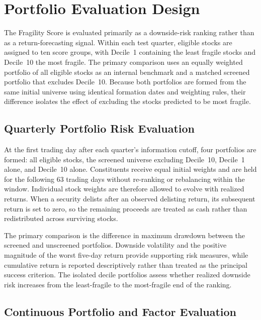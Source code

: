 \section{Portfolio Evaluation Design}
\label{sec:portfolio_evaluation_design}

The Fragility Score is evaluated primarily as a downside-risk ranking rather than as a return-forecasting signal. Within each test quarter, eligible stocks are assigned to ten score groups, with Decile~1 containing the least fragile stocks and Decile~10 the most fragile. The primary comparison uses an equally weighted portfolio of all eligible stocks as an internal benchmark and a matched screened portfolio that excludes Decile~10. Because both portfolios are formed from the same initial universe using identical formation dates and weighting rules, their difference isolates the effect of excluding the stocks predicted to be most fragile.

\subsection{Quarterly Portfolio Risk Evaluation}

At the first trading day after each quarter's information cutoff, four portfolios are formed: all eligible stocks, the screened universe excluding Decile~10, Decile~1 alone, and Decile~10 alone. Constituents receive equal initial weights and are held for the following 63 trading days without re-ranking or rebalancing within the window. Individual stock weights are therefore allowed to evolve with realized returns. When a security delists after an observed delisting return, its subsequent return is set to zero, so the remaining proceeds are treated as cash rather than redistributed across surviving stocks.

The primary comparison is the difference in maximum drawdown between the screened and unscreened portfolios. Downside volatility and the positive magnitude of the worst five-day return provide supporting risk measures, while cumulative return is reported descriptively rather than treated as the principal success criterion. The isolated decile portfolios assess whether realized downside risk increases from the least-fragile to the most-fragile end of the ranking.

\subsection{Continuous Portfolio and Factor Evaluation}

